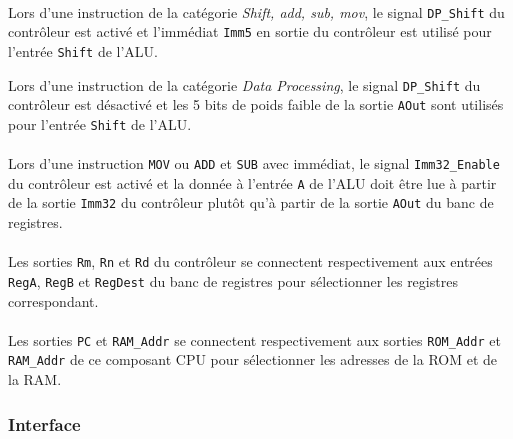 \documentclass{article}
\begin{document}
    \paragraph{}
    Lors d'une instruction de la catégorie \textit{Shift, add, sub, mov}, le signal \texttt{DP\_Shift} du contrôleur est activé et l'immédiat \texttt{Imm5} en sortie du contrôleur est utilisé pour l'entrée \texttt{Shift} de l'ALU.

    Lors d'une instruction de la catégorie \textit{Data Processing}, le signal \texttt{DP\_Shift} du contrôleur est désactivé et les 5 bits de poids faible de la sortie \texttt{AOut} sont utilisés pour l'entrée \texttt{Shift} de l'ALU.

    \paragraph{}
    Lors d'une instruction \texttt{MOV} ou \texttt{ADD} et \texttt{SUB} avec immédiat, le signal \texttt{Imm32\_Enable} du contrôleur est activé
    et la donnée à l'entrée \texttt{A} de l'ALU doit être lue à partir de la sortie \texttt{Imm32} du contrôleur plutôt qu'à partir de la sortie \texttt{AOut} du banc de registres.

    \paragraph{}
    Les sorties \texttt{Rm}, \texttt{Rn} et \texttt{Rd} du contrôleur se connectent respectivement aux entrées \texttt{RegA}, \texttt{RegB} et \texttt{RegDest} du banc de registres pour sélectionner les registres correspondant.

    \paragraph{}
    Les sorties \texttt{PC} et \texttt{RAM\_Addr} se connectent respectivement aux sorties \texttt{ROM\_Addr} et \texttt{RAM\_Addr} de ce composant CPU pour sélectionner les adresses de la ROM et de la RAM.

    \subsubsection{Interface}

\end{document}
